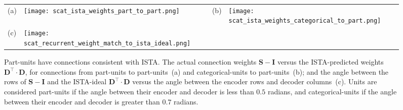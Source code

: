 \documentclass{article} %
\newcommand{\D}{\mathbf{D}}
\newcommand{\I}{\mathbf{I}}
\newcommand{\Sm}{\mathbf{S}}
\begin{document}
\begin{figure}[p] %
  \begin{center}
    \begin{tabular}{p{0.04in}p{2.4in}p{0.04in}p{2.4in}}
      \parbox[b]{0in}{(a) \vspace{3.8cm}} & \texttt{[image: scat\_ista\_weights\_part\_to\_part.png]} &
      \parbox[b]{0in}{(b) \vspace{3.8cm}} & \texttt{[image: scat\_ista\_weights\_categorical\_to\_part.png]}  \\
      \parbox[b]{0in}{(c) \vspace{3.8cm}} & \texttt{[image: scat\_recurrent\_weight\_match\_to\_ista\_ideal.png]}
    \end{tabular}
  \end{center}
  \caption{Part-units have connections consistent with ISTA.  The actual connection weights $\Sm - \I$ versus the ISTA-predicted weights $\D^{\top} \cdot \D$, for connections from part-units to part-units~(a) and categorical-units to part-units~(b); and the angle between the rows of $\Sm - \I$ and the ISTA-ideal $\D^{\top} \cdot \D$ versus the angle between the encoder rows and decoder columns~(c).  Units are considered part-units if the angle between their encoder and decoder is less than $0.5$ radians, and categorical-units if the angle between their encoder and decoder is greater than $0.7$ radians. \label{ista_ideal_connections_figure}}
\end{figure}
\end{document}
